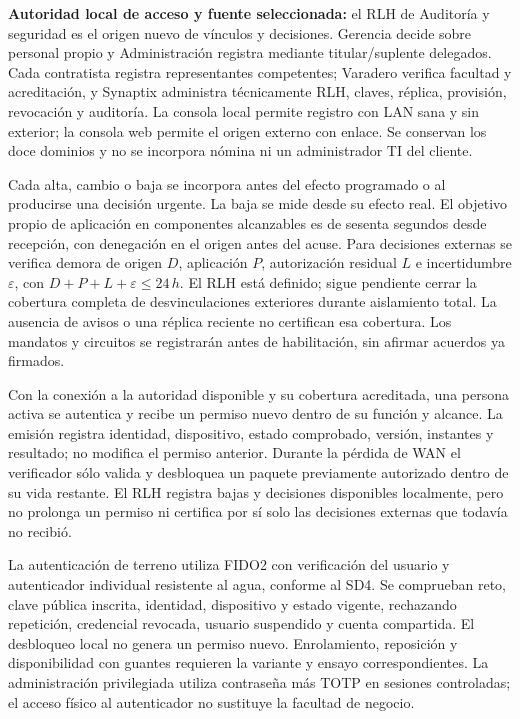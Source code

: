 \textbf{Autoridad local de acceso y fuente seleccionada:} el RLH de Auditoría y seguridad es el origen nuevo de vínculos y decisiones. Gerencia decide sobre personal propio y Administración registra mediante titular/suplente delegados. Cada contratista registra representantes competentes; Varadero verifica facultad y acreditación, y Synaptix administra técnicamente RLH, claves, réplica, provisión, revocación y auditoría. La consola local permite registro con LAN sana y sin exterior; la consola web permite el origen externo con enlace. Se conservan los doce dominios y no se incorpora nómina ni un administrador TI del cliente.

Cada alta, cambio o baja se incorpora antes del efecto programado o al producirse una decisión urgente. La baja se mide desde su efecto real. El objetivo propio de aplicación en componentes alcanzables es de sesenta segundos desde recepción, con denegación en el origen antes del acuse. Para decisiones externas se verifica demora de origen \(D\), aplicación \(P\), autorización residual \(L\) e incertidumbre \(\varepsilon\), con \(D+P+L+\varepsilon\leq24\,h\). El RLH está definido; sigue pendiente cerrar la cobertura completa de desvinculaciones exteriores durante aislamiento total. La ausencia de avisos o una réplica reciente no certifican esa cobertura. Los mandatos y circuitos se registrarán antes de habilitación, sin afirmar acuerdos ya firmados.

Con la conexión a la autoridad disponible y su cobertura acreditada, una persona activa se autentica y recibe un permiso nuevo dentro de su función y alcance. La emisión registra identidad, dispositivo, estado comprobado, versión, instantes y resultado; no modifica el permiso anterior. Durante la pérdida de WAN el verificador sólo valida y desbloquea un paquete previamente autorizado dentro de su vida restante. El RLH registra bajas y decisiones disponibles localmente, pero no prolonga un permiso ni certifica por sí solo las decisiones externas que todavía no recibió.

La autenticación de terreno utiliza FIDO2 con verificación del usuario y autenticador individual resistente al agua, conforme al SD4. Se comprueban reto, clave pública inscrita, identidad, dispositivo y estado vigente, rechazando repetición, credencial revocada, usuario suspendido y cuenta compartida. El desbloqueo local no genera un permiso nuevo. Enrolamiento, reposición y disponibilidad con guantes requieren la variante y ensayo correspondientes. La administración privilegiada utiliza contraseña más TOTP en sesiones controladas; el acceso físico al autenticador no sustituye la facultad de negocio.


